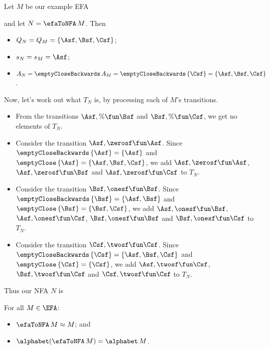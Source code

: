 Let $M$ be our example EFA
\begin{center}

\end{center}
and let $N=\efaToNFA\,M$.  Then
\begin{itemize}
\item $Q_N=Q_M=\{\Asf,\Bsf,\Csf\}$;

\item $s_N=s_M=\Asf$;

\item $A_N=\emptyCloseBackwards\,A_M=\emptyCloseBackwards\,\{\Csf\}=
  \{\Asf,\Bsf,\Csf\}$.
\end{itemize}
Now, let's work out what $T_N$ is, by processing each of $M$'s transitions.
\begin{itemize}
\item From the transitions $\Asf,\%\fun\Bsf$ and $\Bsf,\%\fun\Csf$, we
  get no elements of $T_N$.

\item Consider the transition $\Asf,\zerosf\fun\Asf$.  Since
  $\emptyCloseBackwards\,\{\Asf\}=\{\Asf\}$ and
  $\emptyClose\,\{\Asf\}=\{\Asf,\Bsf,\Csf\}$, we add
  $\Asf,\zerosf\fun\Asf$, $\Asf,\zerosf\fun\Bsf$ and
  $\Asf,\zerosf\fun\Csf$ to $T_N$.

\item Consider the transition $\Bsf,\onesf\fun\Bsf$.  Since
  $\emptyCloseBackwards\,\{\Bsf\}=\{\Asf,\Bsf\}$ and
  $\emptyClose\,\{\Bsf\}=\{\Bsf,\Csf\}$, we add
  $\Asf,\onesf\fun\Bsf$, $\Asf,\onesf\fun\Csf$, $\Bsf,\onesf\fun\Bsf$
  and $\Bsf,\onesf\fun\Csf$ to $T_N$.

\item Consider the transition $\Csf,\twosf\fun\Csf$.  Since
  $\emptyCloseBackwards\,\{\Csf\}=\{\Asf,\Bsf,\Csf\}$ and
  $\emptyClose\,\{\Csf\}=\{\Csf\}$, we add
  $\Asf,\twosf\fun\Csf$, $\Bsf,\twosf\fun\Csf$ and $\Csf,\twosf\fun\Csf$
  to $T_N$.
\end{itemize}

Thus our NFA $N$ is
\begin{center}

\end{center}

\begin{theorem}
\label{EFAToNFATheorem}
For all $M\in\EFA$:
\begin{itemize}
\item $\efaToNFA\,M\approx M$; and

\item $\alphabet(\efaToNFA\,M) = \alphabet\,M$.
\end{itemize}
\end{theorem}

